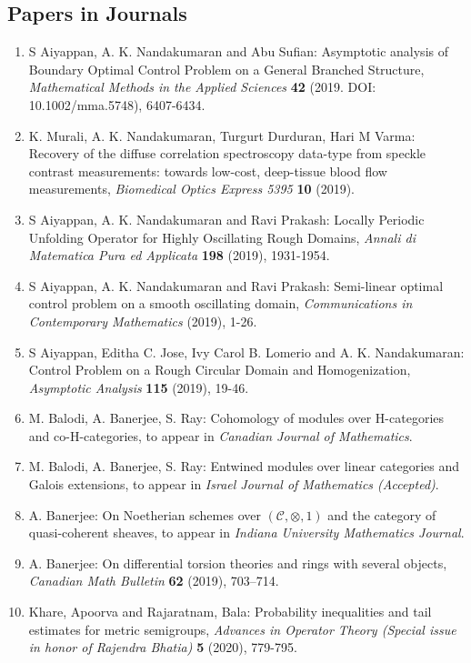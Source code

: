 
\subsection{Papers in Journals}

\begin{enumerate}
\item S Aiyappan, A. K. Nandakumaran and Abu Sufian: Asymptotic analysis of Boundary Optimal Control Problem on a General Branched Structure, \emph{Mathematical Methods in the Applied Sciences} {\bf 42} (2019. DOI: 10.1002/mma.5748), 6407-6434.
\item K. Murali, A. K. Nandakumaran, Turgurt Durduran, Hari M Varma: Recovery of the diffuse correlation spectroscopy data-type from speckle contrast measurements: towards low-cost, deep-tissue blood flow measurements, \emph{Biomedical Optics Express 5395} {\bf 10} (2019).
\item S Aiyappan, A. K. Nandakumaran and Ravi Prakash: Locally Periodic Unfolding Operator for Highly Oscillating Rough Domains, \emph{Annali di Matematica Pura ed Applicata} {\bf 198} (2019), 1931-1954.
\item S Aiyappan, A. K. Nandakumaran and Ravi Prakash: Semi-linear optimal control problem on a smooth oscillating domain, \emph{Communications in Contemporary Mathematics} {\bf } (2019), 1-26.
\item S Aiyappan, Editha C. Jose, Ivy Carol B. Lomerio and A. K. Nandakumaran: Control Problem on a Rough Circular Domain and Homogenization, \emph{Asymptotic Analysis} {\bf 115} (2019), 19-46.
\item M. Balodi, A. Banerjee, S. Ray: Cohomology of modules over H-categories and co-H-categories, to appear in \emph{Canadian Journal of Mathematics}.
\item M. Balodi, A. Banerjee, S. Ray: Entwined modules over linear categories and Galois extensions, to appear in \emph{Israel Journal of Mathematics (Accepted)}.
\item A. Banerjee: On Noetherian schemes over $(\mathcal C,\otimes,1)$ and the category of quasi-coherent sheaves, to appear in \emph{Indiana University Mathematics Journal}.
\item A. Banerjee: On differential torsion theories and rings with several objects, \emph{Canadian Math Bulletin} {\bf 62} (2019), 703--714.
\item Khare, Apoorva and Rajaratnam, Bala: Probability inequalities and tail estimates for metric semigroups, \emph{Advances in Operator Theory (Special issue in honor of Rajendra Bhatia)} {\bf 5} (2020), 779-795.

\end{enumerate}
